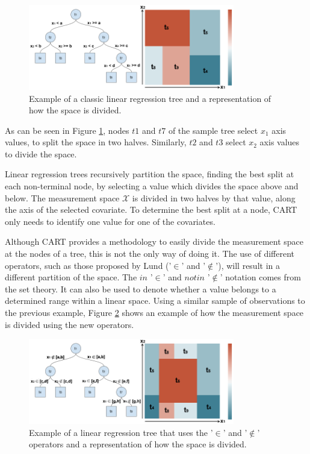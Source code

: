 \documentclass[times,twocolumn,final,authoryear]{elsarticle}
\begin{document}
\begin{figure}
  \includegraphics[width=9cm]{fig1_master.png}
\caption{Example of a classic linear regression tree and a representation of how the space is divided. }
\label{f1}       %
\end{figure}
%
 
As can be seen in Figure \ref{f1}, nodes $t1$ and $t7$ of the sample tree select $x_1$ axis values, to split the space in two halves. Similarly, $t2$ and $t3$ select $x_2$ axis values to divide the space.

Linear regression trees recursively partition the space, finding the best split at each non-terminal node, by selecting a value which divides the space above and below. The measurement space $\mathcal{X}$ is divided in two halves by that value, along the axis of the selected covariate. To determine the best split at a node, CART only needs to identify one value for one of the covariates.

Although CART provides a methodology to easily divide the measurement space at the nodes of a tree, this is not the only way of doing it. The use of different operators, such as those proposed by Lund ('$\in$' and '$\notin$'), will result in a different partition of the space. The $in$ '$\in$' and $not in$ '$\notin$' notation comes from the set theory. It can also be used to denote whether a value belongs to a determined range within a linear space. Using a similar sample of observations to the previous example, Figure \ref{f2} shows an example of how the measurement space is divided using the new operators.

%
\begin{figure}
  \includegraphics[width=9cm]{fig2_master.png}
\caption{Example of a linear regression tree that uses the '$\in$' and '$\notin$' operators and a representation of how the space is divided.}
\label{f2}       %
\end{figure}
%
\end{document}
